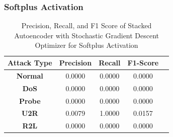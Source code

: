 \documentclass[12pt, a4paper]{report}
\begin{document}
\subsubsection{Softplus Activation}
\begin{table}[ht]
\centering
\captionsetup{justification=centering,margin=2cm}
\begin{tabular}{|c|c|c|c|c|}
\hline
\multicolumn{1}{|c|}{\textbf{Attack Type}} & \multicolumn{1}{c|}{\textbf{Precision}} & \multicolumn{1}{c|}{\textbf{Recall}} & \multicolumn{1}{c|}{\textbf{F1-Score}} \\ \hline
\textbf{Normal}        & 0.0000                                   & 0.0000                                & 0.0000                                                                  \\ \hline
\textbf{DoS}           & 0.0000                                  & 0.0000                                &  0.0000                                                                    \\ \hline
\textbf{Probe}         & 0.0000                                  & 0.0000                                & 0.0000                                                                  \\ \hline
\textbf{U2R}           & 0.0079                                    & 1.0000                                & 0.0157                                                                   \\ \hline
\textbf{R2L}           & 0.0000                                      & 0.0000                                   & 0.0000                                                            \\ \hline         \end{tabular}
\caption{Precision, Recall, and F1 Score of Stacked Autoencoder with Stochastic Gradient Descent Optimizer for Softplus Activation}
\label{prf1_rmsprop_elu_auto}
\end{table}

\clearpage
\end{document}
